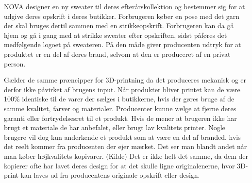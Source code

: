 NOVA designer en ny sweater til deres efterårskollektion og bestemmer sig for at udgive deres opskrift i deres butikker. Forbrugeren køber en pose med det garn der skal bruges dertil sammen med en strikkeopskrift. Forbrugeren kan da gå hjem og gå i gang med at strikke sweater efter opskriften, sidst påføres det medfølgende logoet på sweateren. På den måde giver producenten udtryk for at produktet er en del af deres brand, selvom at den er produceret af en privat person.	%
																																	
Gælder de samme præncipper for 3D-printning da det produceres mekanisk og er derfor ikke påvirket af brugens input. Når produkter bliver printet kan de være 100\% identiske til de varer der sælges i butikkerne, hvis der gøres bruge af de samme kvalitet, farver og materialer.
Producenter kunne vælge at fjerne deres garanti eller fortrydelsesret til et produkt. Hvis de mener at brugeren ikke har brugt et materiale de har anbefalet, eller brugt lav kvalitets printer.
Nogle brugere vil dog kun anderkende et produkt som at være en del af branded, hvis det reelt kommer fra producenten der ejer mærket. Det ser man blandt andet når man køber højkvalitets kopivarer. (Kilde)
Det er ikke helt det samme, da dem der kopierer ofte har lavet deres design for at det skulle ligne originalenerne, hvor 3D-print kan laves ud fra producentens originale opskrift eller design.
